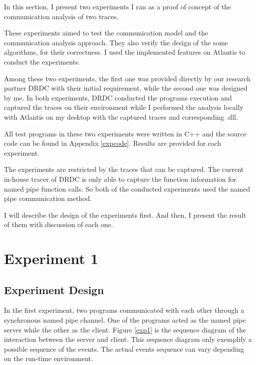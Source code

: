 


\label{chapter:Exp}
In this section, I present two experiments I ran as a proof of concept of the communication analysis of two traces.

These experiments aimed to test the communication model and the communication analysis approach. They also verify the design of the some algorithms, for their correctness. I used the implemented features on Atlantis to conduct the experiments.

Among these two experiments, the first one was provided directly by our research partner DRDC with their initial requirement, while the second one was designed by me. In both experiments, DRDC conducted the programs execution and captured the traces on their environment while I performed the analysis locally with Atlantis on my desktop with the captured traces and corresponding .dll.

All test programs in these two experiments were written in C++ and the source code can be found in Appendix \ref{expcode}. Results are provided for each experiment. 

The experiments are restricted by the traces that can
be captured.  The current in-house tracer of DRDC is only able to capture the function information for named pipe function calls. So both of the conducted experiments used the named pipe communication method. 

I will describe the design of the experiments first. And then, I present the result of them with discussion of each one.

\section{Experiment 1}
\subsection{Experiment Design}
In the first experiment, two programs communicated with each other through a synchronous named pipe channel. One of the programs acted as the named pipe server while the other as the client. Figure \ref{exp1} is the sequence diagram of the interaction between the server and client. This sequence diagram only exemplify a possible sequence of the events. The actual events sequence can vary depending on the run-time environment. 


